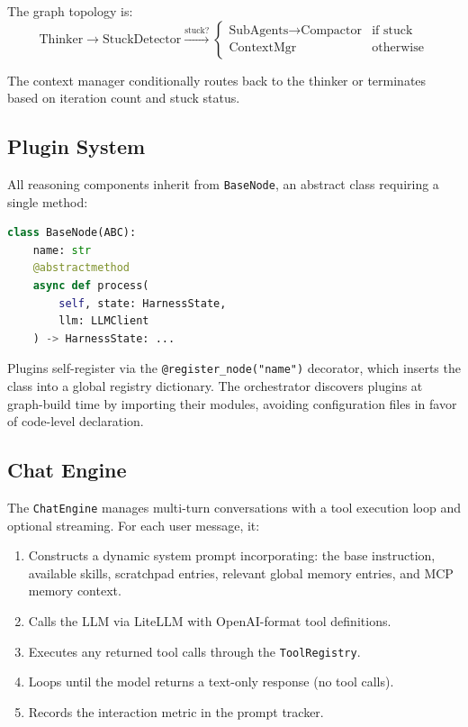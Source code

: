 \documentclass[conference]{IEEEtran}
\begin{document}
The graph topology is:
\begin{equation}
\text{Thinker} \rightarrow \text{StuckDetector} \xrightarrow{\text{stuck?}} \begin{cases} \text{SubAgents} \rightarrow \text{Compactor} & \text{if stuck} \\ \text{ContextMgr} & \text{otherwise} \end{cases}
\end{equation}

The context manager conditionally routes back to the thinker or terminates based on iteration count and stuck status.

\subsection{Plugin System}

All reasoning components inherit from \texttt{BaseNode}, an abstract class requiring a single method:

\begin{lstlisting}[language=Python, caption={Plugin base class interface.}]
class BaseNode(ABC):
    name: str
    @abstractmethod
    async def process(
        self, state: HarnessState,
        llm: LLMClient
    ) -> HarnessState: ...
\end{lstlisting}

Plugins self-register via the \texttt{@register\_node("name")} decorator, which inserts the class into a global registry dictionary. The orchestrator discovers plugins at graph-build time by importing their modules, avoiding configuration files in favor of code-level declaration.

\subsection{Chat Engine}

The \texttt{ChatEngine} manages multi-turn conversations with a tool execution loop and optional streaming. For each user message, it:

\begin{enumerate}
    \item Constructs a dynamic system prompt incorporating: the base instruction, available skills, scratchpad entries, relevant global memory entries, and MCP memory context.
    \item Calls the LLM via LiteLLM with OpenAI-format tool definitions.
    \item Executes any returned tool calls through the \texttt{ToolRegistry}.
    \item Loops until the model returns a text-only response (no tool calls).
    \item Records the interaction metric in the prompt tracker.
\end{enumerate}
\end{document}
